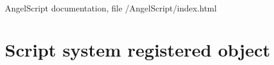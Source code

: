 \documentclass[a4paper, 12pt]{report}
\begin{document}

\begin{thebibliography}{9}
AngelScript documentation, file /AngelScript/index.html
\end{thebibliography}



\clearpage
{}
\listoffigures

\clearpage
{}
\listoftables

\appendix

\chapter{Script system registered object}


\end{document}
